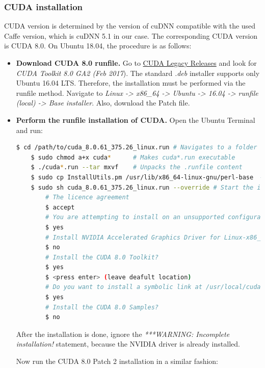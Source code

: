 
\subsubsection{CUDA installation}

CUDA version is determined by the version of cuDNN compatible with the used Caffe version, which is cuDNN 5.1 in our case. The corresponding CUDA version is CUDA 8.0. On Ubuntu 18.04, the procedure is as follows: \cite{nvidia_dev}

\begin{itemize}
	\item \textbf{Download CUDA 8.0 runfile.} Go to \href{https://developer.nvidia.com/cuda-80-ga2-download-archive}{CUDA Legacy Releases} and look for \textit{CUDA Toolkit 8.0 GA2 (Feb 2017}). The standard \textit{.deb} installer supports only Ubuntu 16.04 LTS. Therefore, the installation must be performed via the runfile method. Navigate to \textit{Linux -> x86\_64 -> Ubuntu -> 16.04 -> runfile (local) -> Base installer}. Also, download the Patch file. 
	
	\item \textbf{Perform the runfile installation of CUDA.} Open the Ubuntu Terminal and run: \cite{nvidia_dev}
	
	\begin{lstlisting}[language=bash]
	$ cd /path/to/cuda_8.0.61_375.26_linux.run # Navigates to a folder with CUDA
	$ sudo chmod a+x cuda*		# Makes cuda*.run executable
	$ ./cuda*.run --tar mxvf 	# Unpacks the .runfile content
	$ sudo cp InstallUtils.pm /usr/lib/x86_64-linux-gnu/perl-base  # Copy one of the extracted files to perl-base
	$ sudo sh cuda_8.0.61_375.26_linux.run --override # Start the installation 
		# The licence agreement
		$ accept 
		# You are attempting to install on an unsupported configuration. Do you wish to continue?
		$ yes 
		# Install NVIDIA Accelerated Graphics Driver for Linux-x86_64 375.26?
		$ no
		# Install the CUDA 8.0 Toolkit?
		$ yes 
		$ <press enter> (leave deafult location)
		# Do you want to install a symbolic link at /usr/local/cuda?
		$ yes
		# Install the CUDA 8.0 Samples?
		$ no
	\end{lstlisting}
	
	After the installation is done, ignore the \textit{***WARNING: Incomplete installation!} statement, because the NVIDIA driver is already installed. 
	
	Now run the CUDA 8.0 Patch 2 installation in a similar fashion:
	

\end{itemize}
